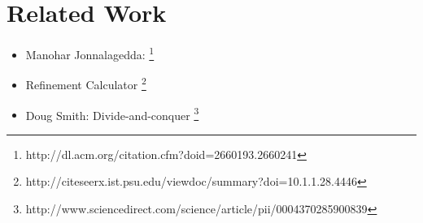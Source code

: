 \section{Related Work}
\label{related}

\begin{itemize}
\color{Gray}
\item Manohar Jonnalagedda: \footnote{http://dl.acm.org/citation.cfm?doid=2660193.2660241}
\item Refinement Calculator  \footnote{http://citeseerx.ist.psu.edu/viewdoc/summary?doi=10.1.1.28.4446}
\item Doug Smith: Divide-and-conquer \footnote{http://www.sciencedirect.com/science/article/pii/0004370285900839}
\end{itemize}